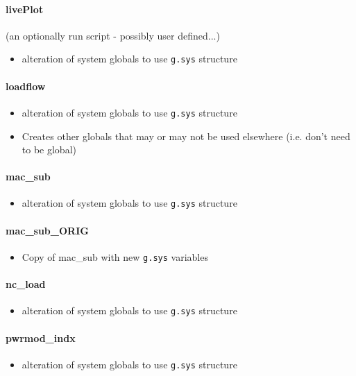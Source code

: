 \documentclass[12pt]{article}
\begin{document}
\paragraph{livePlot} (an optionally run script - possibly user defined...)
	\begin{itemize}
		\item alteration of system globals to use \verb|g.sys| structure
	\end{itemize}
\paragraph{loadflow}
	\begin{itemize}
		\item alteration of system globals to use \verb|g.sys| structure
		\item Creates other globals that may or may  not be used elsewhere (i.e. don't need to be global)
	\end{itemize}
\paragraph{mac\_sub}
	\begin{itemize}
		\item alteration of system globals to use \verb|g.sys| structure
	\end{itemize}
\paragraph{mac\_sub\_ORIG}
	\begin{itemize}
		\item Copy of mac\_sub with new \verb|g.sys| variables
	\end{itemize}
\paragraph{nc\_load}
	\begin{itemize}
		\item alteration of system globals to use \verb|g.sys| structure
	\end{itemize}
\paragraph{pwrmod\_indx}
	\begin{itemize}
		\item alteration of system globals to use \verb|g.sys| structure
	\end{itemize}
\end{document}
